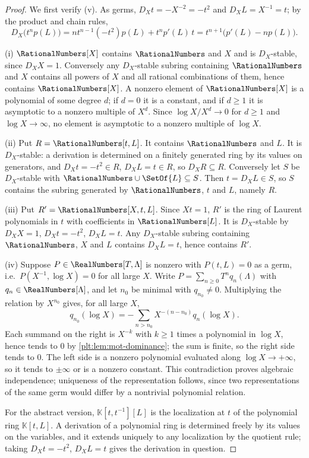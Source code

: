 \documentclass[11pt,oneside]{article}
\theoremstyle{plain}
\theoremstyle{definition}
\theoremstyle{remark}
\newcommand{\K}{\mathbb{K}}
\newcommand{\DX}{D_{X}}                                  %
\begin{document}
\begin{proof}
We first verify (v).  As germs, \(\DX t=-X^{-2}=-t^{2}\) and
\(\DX L=X^{-1}=t\); by the product and chain rules,
\[
  \DX\bigl(t^{n}p(L)\bigr)
  =nt^{n-1}(-t^{2})p(L)+t^{n}p'(L)\,t
  =t^{n+1}\bigl(p'(L)-np(L)\bigr).
\]

(i) \(\RationalNumbers[X]\) contains \(\RationalNumbers\) and \(X\) and is
\(\DX\)-stable, since \(\DX X=1\).  Conversely any \(\DX\)-stable subring
containing \(\RationalNumbers\) and \(X\) contains all powers of \(X\) and all
rational combinations of them, hence contains \(\RationalNumbers[X]\).  A
nonzero element of \(\RationalNumbers[X]\) is a polynomial of some degree
\(d\); if \(d=0\) it is a constant, and if \(d\ge1\) it is asymptotic to a
nonzero multiple of \(X^{d}\).  Since \(\log X/X^{d}\to0\) for \(d\ge1\) and
\(\log X\to\infty\), no element is asymptotic to a nonzero multiple of
\(\log X\).

(ii) Put \(R=\RationalNumbers[t,L]\).  It contains \(\RationalNumbers\) and
\(L\).  It is \(\DX\)-stable: a derivation is determined on a finitely
generated ring by its values on generators, and \(\DX t=-t^{2}\in R\),
\(\DX L=t\in R\), so \(\DX R\subseteq R\).  Conversely let \(S\) be
\(\DX\)-stable with \(\RationalNumbers\cup\SetOf{L}\subseteq S\).  Then
\(t=\DX L\in S\), so \(S\) contains the subring generated by
\(\RationalNumbers\), \(t\) and \(L\), namely \(R\).

(iii) Put \(R'=\RationalNumbers[X,t,L]\).  Since \(Xt=1\), \(R'\) is the ring
of Laurent polynomials in \(t\) with coefficients in
\(\RationalNumbers[L]\).  It is \(\DX\)-stable by \(\DX X=1\),
\(\DX t=-t^{2}\), \(\DX L=t\).  Any \(\DX\)-stable subring containing
\(\RationalNumbers\), \(X\) and \(L\) contains \(\DX L=t\), hence contains
\(R'\).

(iv) Suppose \(P\in\RealNumbers[T,\Lambda]\) is nonzero with \(P(t,L)=0\) as a
germ, i.e.\ \(P(X^{-1},\log X)=0\) for all large \(X\).  Write
\(P=\sum_{n\ge0}T^{n}q_{n}(\Lambda)\) with
\(q_{n}\in\RealNumbers[\Lambda]\), and let \(n_{0}\) be minimal with
\(q_{n_{0}}\ne0\).  Multiplying the relation by \(X^{n_{0}}\) gives, for all
large \(X\),
\[
  q_{n_{0}}(\log X)=-\sum_{n>n_{0}}X^{-(n-n_{0})}q_{n}(\log X).
\]
Each summand on the right is \(X^{-k}\) with \(k\ge1\) times a polynomial in
\(\log X\), hence tends to \(0\) by \cref{plt:lem:mot-dominance}; the sum is
finite, so the right side tends to \(0\).  The left side is a nonzero
polynomial evaluated along \(\log X\to+\infty\), so it tends to \(\pm\infty\)
or is a nonzero constant.  This contradiction proves algebraic independence;
uniqueness of the representation follows, since two representations of the same
germ would differ by a nontrivial polynomial relation.

For the abstract version, \(\K[t,t^{-1}][L]\) is the localization at \(t\) of
the polynomial ring \(\K[t,L]\).  A derivation of a polynomial ring is
determined freely by its values on the variables, and it extends uniquely to
any localization by the quotient rule; taking \(\DX t=-t^{2}\), \(\DX L=t\)
gives the derivation in question.
\end{proof}
\end{document}

